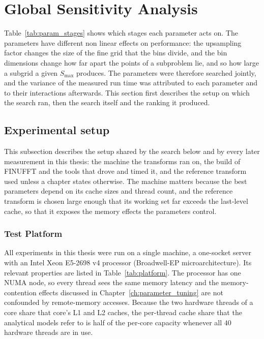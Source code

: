 \section[Global Sensitivity Analysis]{Global Sensitivity Analysis}
\label{sec:gp_sensitivity}

Table~\ref{tab:param_stages} shows which stages each parameter acts on. The parameters have different non linear effects on performance: the upsampling factor changes the size of the fine grid that the bins divide, and the bin dimensions change how far apart the points of a subproblem lie, and so how large a subgrid a given $S_{\max}$ produces. The parameters were therefore searched jointly, and the variance of the measured run time was attributed to each parameter and to their interactions afterwards. This section first describes the setup on which the search ran, then the search itself and the ranking it produced.

\subsection{Experimental setup}

This subsection describes the setup shared by the search below and by every later measurement in this thesis: the machine the transforms ran on, the build of FINUFFT and the tools that drove and timed it, and the reference transform used unless a chapter states otherwise. The machine matters because the best parameters depend on its cache sizes and thread count, and the reference transform is chosen large enough that its working set far exceeds the last-level cache, so that it exposes the memory effects the parameters control.

\subsubsection{Test Platform}
\label{sec:platform}

All experiments in this thesis were run on a single machine, a one-socket server with an Intel Xeon E5-2698 v4 processor (Broadwell-EP microarchitecture). Its relevant properties are listed in Table~\ref{tab:platform}. The processor has one NUMA node, so every thread sees the same memory latency and the memory-contention effects discussed in Chapter~\ref{ch:parameter_tuning} are not confounded by remote-memory accesses. Because the two hardware threads of a core share that core's L1 and L2 caches, the per-thread cache share that the analytical models refer to is half of the per-core capacity whenever all $40$ hardware threads are in use.

